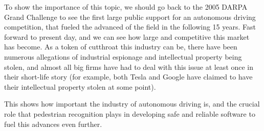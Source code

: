 To show the importance of this topic, we should go back to the 2005 DARPA Grand Challenge to see the first large public support for an autonomous driving competition, that fueled the advanced of the field in the following 15 years. Fast forward to present day, and we can see how large and competitive this market has become. As a token of cutthroat this industry can be, there have been numerous allegations of industrial espionage and intellectual property being stolen, and almost all big firms have had to deal with this issue at least once in their short-life story (for example, both Tesla and Google have claimed to have their intellectual property stolen at some point).

This shows how important the industry of autonomous driving is, and the crucial role that pedestrian recognition plays in developing safe and reliable software to fuel this advances even further.

